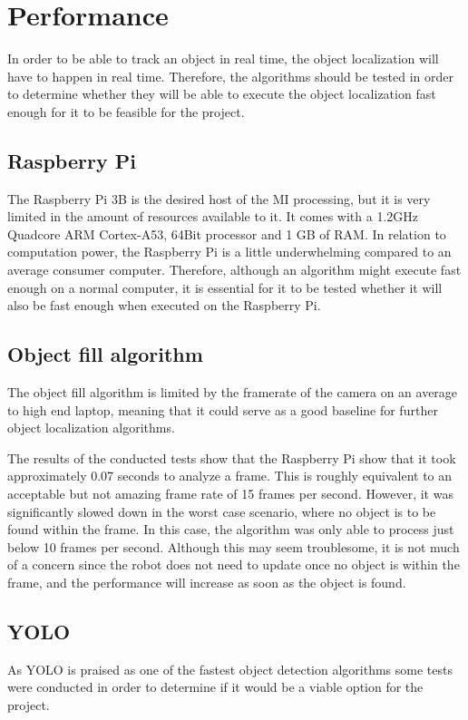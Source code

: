 \section{Performance}
In order to be able to track an object in real time, the object localization will have to happen in real time.
Therefore, the algorithms should be tested in order to determine whether they will be able to execute the object localization fast enough for it to be feasible for the project.

\subsection{Raspberry Pi}
The Raspberry Pi 3B is the desired host of the MI processing, but it is very limited in the amount of resources available to it.
It comes with a 1.2GHz Quadcore ARM Cortex-A53, 64Bit processor and 1 GB of RAM.
In relation to computation power, the Raspberry Pi is a little underwhelming compared to an average consumer computer.
Therefore, although an algorithm might execute fast enough on a normal computer, it is essential for it to be tested whether it will also be fast enough when executed on the Raspberry Pi.

\subsection{Object fill algorithm}
The object fill algorithm is limited by the framerate of the camera on an average to high end laptop, meaning that it could serve as a good baseline for further object localization algorithms.

The results of the conducted tests show that the Raspberry Pi show that it took approximately 0.07 seconds to analyze a frame.
This is roughly equivalent to an acceptable but not amazing frame rate of 15 frames per second.
However, it was significantly slowed down in the worst case scenario, where no object is to be found within the frame.
In this case, the algorithm was only able to process just below 10 frames per second.
Although this may seem troublesome, it is not much of a concern since the robot does not need to update once no object is within the frame, and the performance will increase as soon as the object is found.

\subsection{YOLO}

As YOLO is praised as one of the fastest object detection algorithms some tests were conducted in order to determine if it would be a viable option for the project.

